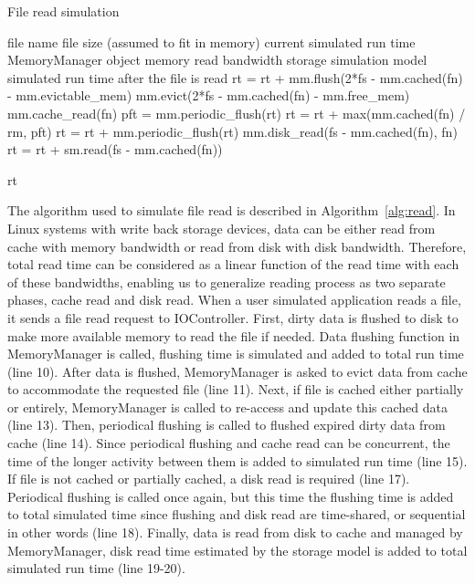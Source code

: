 \documentclass[conference]{IEEEtran}
\newcommand{\Desc}[2]{\State \makebox[2em][l]{#1}#2}
\begin{document}
			\begin{algorithm}\caption{File read simulation}\label{alg:read}
				\small
				\begin{algorithmic}[1]
					\Input
        				\Desc{fn}{file name}
        				\Desc{fs}{file size (assumed to fit in memory)}
						\Desc{rt}{current simulated run time}
						\Desc{mm}{MemoryManager object}
						\Desc{rm}{memory read bandwidth}
						\Desc{sm}{storage simulation model}
   					\EndInput
   					\Output
						\Desc{rt}{simulated run time after the file is read}
   					\EndOutput
					\State rt = rt + mm.flush(2*fs - mm.cached(fn) - mm.evictable\_mem) 
					\State mm.evict(2*fs - mm.cached(fn) - mm.free\_mem) 
					  
    					\State mm.cache\_read(fn)  
    					\State pft = mm.periodic\_flush(rt) 
						\State rt = rt + max(mm.cached(fn) / rm, pft) 
					\EndIf
					 
						\State rt = rt + mm.periodic\_flush(rt) 
						\State mm.disk\_read(fs - mm.cached(fn), fn)
    					\State rt = rt + sm.read(fs - mm.cached(fn))
					\EndIf					
					
					\State \Return rt
					
				\end{algorithmic}
			\end{algorithm}			
			
			The algorithm used to simulate file read is described in 
			Algorithm~\ref{alg:read}. 
			In Linux systems with write back storage devices, data can be either read 
			from cache with memory bandwidth or read from disk with disk bandwidth. 
			Therefore, total read time can be considered as a linear function 
			of the read time with each of these bandwidths, 
			enabling us to generalize reading process as two separate phases, 
			cache read and disk read. 
			When a user simulated application reads a file, 
			it sends a file read request to IOController. 
			First, dirty data is flushed to disk to make more available memory 
			to read the file if needed.
			Data flushing function in MemoryManager is called, flushing time is 
			simulated and added to total run time (line 10).
			After data is flushed, MemoryManager is asked to evict data 
			from cache to accommodate the requested file (line 11). 
			Next, if file is cached either partially or entirely, MemoryManager is 
			called to re-access and update this cached data (line 13). 
			Then, periodical flushing is called to flushed expired dirty data 
			from cache (line 14).
			Since periodical flushing and cache read can be concurrent, the time of 
			the longer activity between them is added to simulated run time (line 15). 
			If file is not cached or partially cached, a disk read is required (line 17). 
			Periodical flushing is called once again, but this time the flushing time is 
			added to total simulated time since flushing and disk read are time-shared, 
			or sequential in other words (line 18).
			Finally, data is read from disk to cache and managed by MemoryManager, 
			disk read time estimated by the storage model is added to 
			total simulated run time (line 19-20). 
\end{document}
